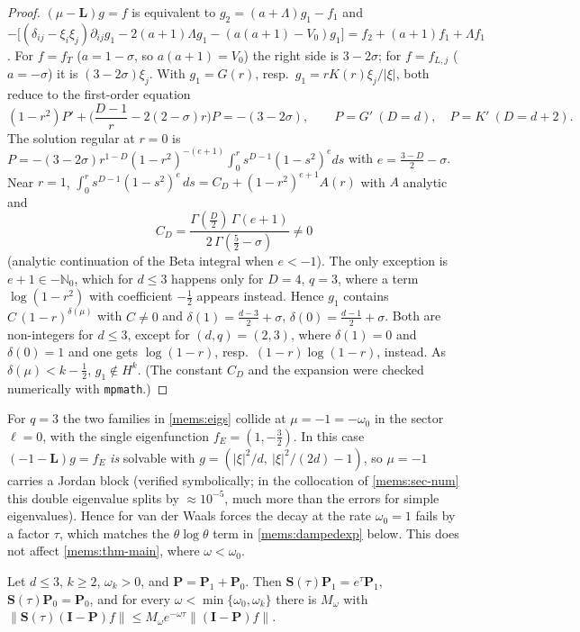 \begin{proof}
$(\mu-\mathbf L)g=f$ is equivalent to $g_2=(a+\Lambda)g_1-f_1$ and
$-\big[(\delta_{ij}-\xi_i\xi_j)\partial_{ij}g_1-2(a+1)\Lambda g_1-(a(a+1)-V_0)g_1\big]=f_2+(a+1)f_1+\Lambda f_1$.
For $f=f_T$ ($a=1-\sigma$, so $a(a+1)=V_0$) the right side is $3-2\sigma$; for
$f=f_{L,j}$ ($a=-\sigma$) it is $(3-2\sigma)\xi_j$. With $g_1=G(r)$, resp.\
$g_1=rK(r)\xi_j/|\xi|$, both reduce to the first-order equation
\[
  (1-r^2)P'+\Big(\frac{D-1}{r}-2(2-\sigma)r\Big)P=-(3-2\sigma),\qquad P=G'\ (D=d),\quad P=K'\ (D=d+2).
\]
The solution regular at $r=0$ is
$P=-(3-2\sigma)r^{1-D}(1-r^2)^{-(e+1)}\int_0^r s^{D-1}(1-s^2)^{e}ds$ with
$e=\frac{3-D}2-\sigma$. Near $r=1$,
$\int_0^r s^{D-1}(1-s^2)^e\,ds=C_D+(1-r^2)^{e+1}A(r)$ with $A$ analytic and
\[
  C_D=\frac{\Gamma(\frac D2)\,\Gamma(e+1)}{2\,\Gamma(\frac52-\sigma)}\neq0
\]
(analytic continuation of the Beta integral when $e<-1$). The only exception
is $e+1\in-\mathbb N_0$, which for $d\le3$ happens only for $D=4$, $q=3$, where a
term $\log(1-r^2)$ with coefficient $-\frac12$ appears instead. Hence $g_1$
contains $C\,(1-r)^{\delta(\mu)}$ with $C\ne0$ and $\delta(1)=\frac{d-3}2+\sigma$,
$\delta(0)=\frac{d-1}2+\sigma$. Both are non-integers for $d\le3$, except for
$(d,q)=(2,3)$, where $\delta(1)=0$ and $\delta(0)=1$ and one gets $\log(1-r)$,
resp.\ $(1-r)\log(1-r)$, instead. As
$\delta(\mu)<k-\frac12$, $g_1\notin H^k$. (The constant $C_D$ and the expansion
were checked numerically with \texttt{mpmath}.)
\end{proof}

\begin{remark}[$q=3$: a Jordan block at the gap]\label{mems:rem-q3}
For $q=3$ the two families in \eqref{mems:eigs} collide at $\mu=-1=-\omega_0$ in the
sector $\ell=0$, with the single eigenfunction $f_E=(1,-\frac32)$. In this case
$(-1-\mathbf L)g=f_E$ \emph{is} solvable with
$g=(|\xi|^2/d,\ |\xi|^2/(2d)-1)$, so $\mu=-1$ carries a Jordan block (verified
symbolically; in the collocation of \cref{mems:sec-num} this double eigenvalue
splits by $\approx10^{-5}$, much more than the errors for simple eigenvalues). Hence for van der Waals forces the decay at the
rate $\omega_0=1$ fails by a factor $\tau$, which matches the $\theta\log\theta$
term in \eqref{mems:dampedexp} below. This does not affect
\cref{mems:thm-main}, where $\omega<\omega_0$.
\end{remark}

\begin{proposition}\label{mems:prop-lin}
Let $d\le3$, $k\ge2$, $\omega_k>0$, and $\mathbf P=\mathbf P_1+\mathbf P_0$. Then
$\mathbf S(\tau)\mathbf P_1=e^\tau\mathbf P_1$, $\mathbf S(\tau)\mathbf P_0=\mathbf P_0$, and for every
$\omega<\min\{\omega_0,\omega_k\}$ there is $M_\omega$ with
$\|\mathbf S(\tau)(\mathbf I-\mathbf P)f\|\le M_\omega e^{-\omega\tau}\|(\mathbf I-\mathbf P)f\|$.
\end{proposition}

